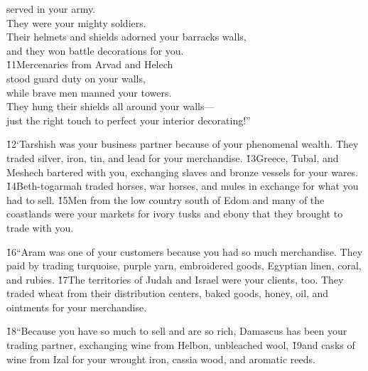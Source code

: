 \begin{poetry}
\poemll    served in your army. \\
\poemlll       They were your mighty soldiers. \\
\poeml Their helmets and shields adorned your barracks walls, \\
\poemll    and they won battle decorations for you. \\
\poeml \v{11}Mercenaries from Arvad and Helech \\
\poemll    stood guard duty on your walls, \\
\poemlll       while brave men manned your towers. \\
\poeml They hung their shields all around your walls--- \\
\poemll    just the right touch to perfect your interior decorating!''
\end{poetry}

\v{12}`Tarshish was your business partner because of your phenomenal wealth. They traded silver, iron, tin, and lead for your merchandise. \v{13}Greece, Tubal, and Meshech bartered with you, exchanging slaves and bronze vessels for your wares. \v{14}Beth-togarmah traded horses, war horses, and mules in exchange for what you had to sell. \v{15}Men from the low country south of Edom and many of the coastlands were your markets for ivory tusks and ebony that they brought to trade with you.

\v{16}``Aram was one of your customers because you had so much merchandise. They paid by trading turquoise, purple yarn, embroidered goods, Egyptian linen, coral, and rubies. \v{17}The territories of Judah and Israel were your clients, too. They traded wheat from their distribution centers, baked goods, honey, oil, and ointments for your merchandise.

\v{18}``Because you have so much to sell and are so rich, Damascus has been your trading partner, exchanging wine from Helbon, unbleached wool, \v{19}and casks of wine from Izal for your wrought iron, cassia wood, and aromatic reeds.

